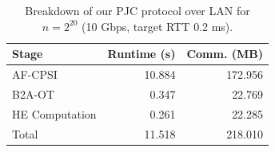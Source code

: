 \begin{table}[t]
\centering
\caption{Breakdown of our PJC protocol over LAN for $n=2^{20}$ (10 Gbps, target RTT 0.2 ms).}
\begin{tabular}{lrr}
\hline
Stage & Runtime (s) & Comm. (MB) \\
\hline
AF-CPSI & 10.884 & 172.956 \\
B2A-OT & 0.347 & 22.769 \\
HE Computation & 0.261 & 22.285 \\
Total & 11.518 & 218.010 \\
\hline
\end{tabular}
\end{table}
